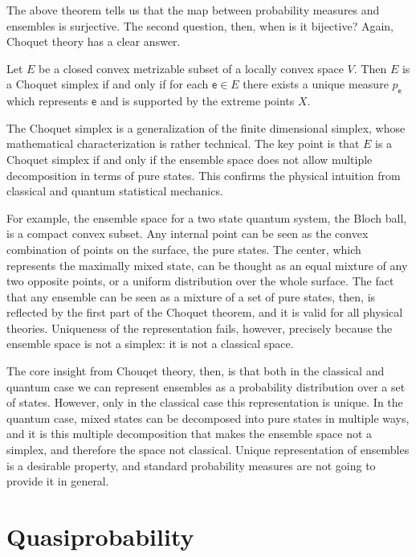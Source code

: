 \documentclass[10pt,twocolumn, nofootinbib]{revtex4-2}
\newcommand{\ens}[1][e] {\mathsf{#1}} %
\begin{document}
The above theorem tells us that the map between probability measures and ensembles is surjective. The second question, then, when is it bijective? Again, Choquet theory has a clear answer.
\begin{thrm}[Choquet 2]
	Let $E$ be a closed convex metrizable subset of a locally convex space $V$. Then $E$ is a Choquet simplex if and only if for each $\ens \in E$ there exists a unique measure $p_{\ens}$ which represents $\ens$ and is supported by the extreme points $X$.
\end{thrm}
The Choquet simplex is a generalization of the finite dimensional simplex, whose mathematical characterization is rather technical. The key point is that $E$ is a Choquet simplex if and only if the ensemble space does not allow multiple decomposition in terms of pure states. This confirms the physical intuition from classical and quantum statistical mechanics.

For example, the ensemble space for a two state quantum system, the Bloch ball, is a compact convex subset. Any internal point can be seen as the convex combination of points on the surface, the pure states. The center, which represents the maximally mixed state, can be thought as an equal mixture of any two opposite points, or a uniform distribution over the whole surface. The fact that any ensemble can be seen as a mixture of a set of pure states, then, is reflected by the first part of the Choquet theorem, and it is valid for all physical theories. Uniqueness of the representation fails, however, precisely because the ensemble space is not a simplex: it is not a classical space.

The core insight from Chouqet theory, then, is that both in the classical and quantum case we can represent ensembles as a probability distribution over a set of states. However, only in the classical case this representation is unique. In the quantum case, mixed states can be decomposed into pure states in multiple ways, and it is this multiple decomposition that makes the ensemble space not a simplex, and therefore the space not classical. Unique representation of ensembles is a desirable property, and standard probability measures are not going to provide it in general.

\section{Quasiprobability}

\end{document}

